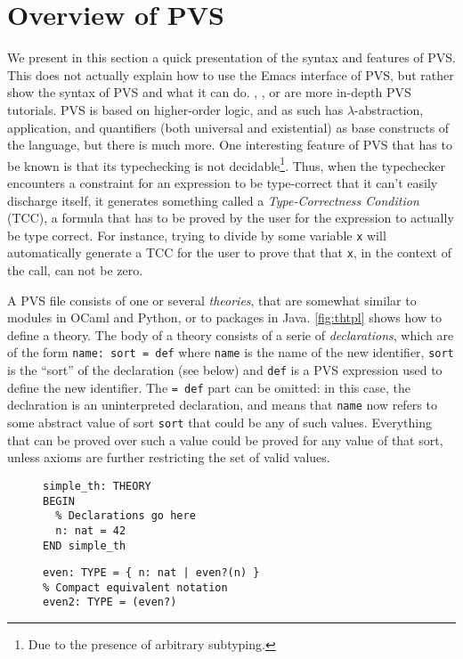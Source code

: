 \documentclass[utf8,a4paper]{article}
\begin{document}
\section{Overview of PVS}
\label{sec:pvs}

We present in this section a quick presentation of the syntax and
features of PVS. This does not actually explain how to use the Emacs
interface of PVS, but rather show the syntax of PVS and what it can
do. \cite{WIFT-Tut}, \cite{PVS:tutorial}, or \cite{Butler:PVS-tut} are
more in-depth PVS tutorials. PVS is based on higher-order logic, and
as such has $\lambda$-abstraction, application, and quantifiers (both
universal and existential) as base constructs of the language, but
there is much more. One interesting feature of PVS that has to be
known is that its typechecking is not decidable\footnote{Due to the
presence of arbitrary subtyping.}. Thus, when the typechecker encounters
a constraint for an expression to be type-correct that it can't easily
discharge itself, it generates something called a
\textit{Type-Correctness Condition} (TCC), a formula that has to be
proved by the user for the expression to actually be type correct. For
instance, trying to divide by some variable \verb!x! will
automatically generate a TCC for the user to prove that that \verb!x!,
in the context of the call, can not be zero.

A PVS file consists of one or several \textit{theories}, that are
somewhat similar to modules in OCaml and Python, or to packages in
Java. \cref{fig:thtpl} shows how to define a theory. The body of a theory
consists of a serie of \textit{declarations}, which are of the form
\verb!name: sort = def!  where \verb!name! is the name of the new
identifier, \verb!sort! is the ``sort'' of the declaration (see below)
and \verb!def! is a PVS expression used to define the new
identifier. The \verb!= def! part can be omitted: in this case, the
declaration is an uninterpreted declaration, and means that
\verb!name! now refers to some abstract value of sort \verb!sort! that
could be any of such values. Everything that can be proved over such a
value could be proved for any value of that sort, unless axioms are
further restricting the set of valid values.

\begin{figure}
  \centering
  \begin{minipage}{0.4\textwidth}
    \centering
    \begin{verbatim}
simple_th: THEORY
BEGIN
  % Declarations go here
  n: nat = 42
END simple_th
    \end{verbatim}
    \label{fig:thtpl}
  \end{minipage}
  \begin{minipage}{0.5\textwidth}
    \centering
    \begin{verbatim}
even: TYPE = { n: nat | even?(n) }
% Compact equivalent notation
even2: TYPE = (even?)
    \end{verbatim}
    \label{fig:subtype}
  \end{minipage}
\end{figure}
\end{document}
